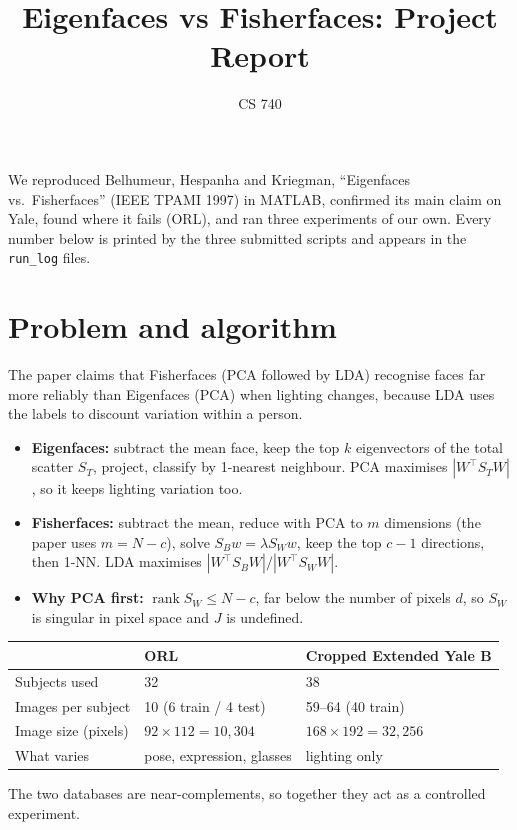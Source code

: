 \documentclass[11pt]{article}
\title{\textbf{Eigenfaces vs Fisherfaces: Project Report}}
\author{CS 740}
\date{}
\newcommand{\T}{^{\top}}
\begin{document}
\maketitle
\vspace{-1.2em}

We reproduced Belhumeur, Hespanha and Kriegman, ``Eigenfaces vs.\ Fisherfaces'' (IEEE TPAMI 1997) in MATLAB, confirmed its main claim on Yale, found where it fails (ORL), and ran three experiments of our own. Every number below is printed by the three submitted scripts and appears in the \texttt{run\_log} files.

\section{Problem and algorithm}
The paper claims that Fisherfaces (PCA followed by LDA) recognise faces far more reliably than Eigenfaces (PCA) when lighting changes, because LDA uses the labels to discount variation within a person.
\begin{itemize}
\item \textbf{Eigenfaces:} subtract the mean face, keep the top $k$ eigenvectors of the total scatter $S_T$, project, classify by 1-nearest neighbour. PCA maximises $|W\T S_TW|$, so it keeps lighting variation too.
\item \textbf{Fisherfaces:} subtract the mean, reduce with PCA to $m$ dimensions (the paper uses $m=N-c$), solve $S_Bw=\lambda S_Ww$, keep the top $c-1$ directions, then 1-NN. LDA maximises $|W\T S_BW|/|W\T S_WW|$.
\item \textbf{Why PCA first:} $\operatorname{rank}S_W\le N-c$, far below the number of pixels $d$, so $S_W$ is singular in pixel space and $J$ is undefined.
\end{itemize}

\begin{center}
\begin{tabular}{lll}\toprule
 & ORL & Cropped Extended Yale B\\\midrule
Subjects used & 32 & 38\\
Images per subject & 10 (6 train / 4 test) & 59--64 (40 train)\\
Image size (pixels) & $92\times112=10{,}304$ & $168\times192=32{,}256$\\
What varies & pose, expression, glasses & lighting only\\\bottomrule
\end{tabular}
\end{center}
The two databases are near-complements, so together they act as a controlled experiment.
\end{document}

